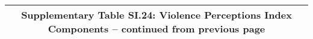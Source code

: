 \begin{longtable}{llcccccccccc}
\multicolumn{12}{c}{{\bfseries Supplementary Table SI.24: Violence Perceptions Index Components -- continued from previous page}} \\ \hline                                                                                                                                                                                                                                                                                                                                                                                                                                                                                                                                                                                                                                                                                                                                               

\end{longtable}
